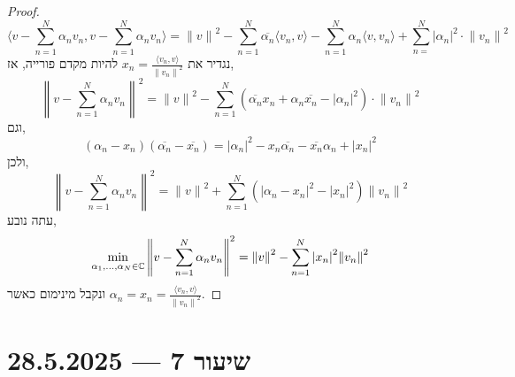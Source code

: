 \begin{proof}
	\[
		\langle v - \sum_{n = 1}^N \alpha_n v_n, v - \sum_{n = 1}^N \alpha_n v_n \rangle
		= {\lVert v \rVert}^2 - \sum_{n = 1}^N \overline{\alpha_n} \langle v_n, v \rangle - \sum_{n = 1}^N \alpha_n \langle v, v_n \rangle + \sum_{n = }^N {| \alpha_n |}^2 \cdot {\lVert v_n \rVert}^2
	\]
	נגדיר את $x_n = \frac{\langle v_n, v \rangle}{{\lVert v_n \rVert}^2}$ להיות מקדם פורייה, אז,
	\[
		{\left\lVert v - \sum_{n = 1}^N \alpha_n v_n \right\rVert}^2
		= {\lVert v \rVert}^2 - \sum_{n = 1}^N (\overline{\alpha_n} x_n + \alpha_n \overline{x_n} - {| \alpha_n |}^2) \cdot {\lVert v_n \rVert}^2
	\]
	וגם,
	\[
		(\alpha_n - x_n)(\overline{\alpha_n} - \overline{x_n})
		= {|\alpha_n|}^2 - x_n \overline{\alpha_n} - \overline{x_n} \alpha_n  + {|x_n|}^2
	\]
	ולכן,
	\[
		{\left\lVert v - \sum_{n = 1}^N \alpha_n v_n \right\rVert}^2
		= {\lVert v \rVert}^2 + \sum_{n = 1}^N \left( {|\alpha_n - x_n|}^2 - {|x_n|}^2 \right) {\lVert v_n \rVert}^2
	\]
	עתה נובע,
	\[
		\min_{\alpha_1, \ldots, \alpha_N \in \mathbb{C}} {\left\lVert v - \sum_{n = 1}^N \alpha_n v_n \right\rVert}^2
		= {\lVert v \rVert}^2 - \sum_{n = 1}^N {|x_n|}^2 {\lVert v_n \rVert}^2
	\]
	ונקבל מינימום כאשר $\alpha_n = x_n = \frac{\langle v_n, v \rangle}{{\lVert v_n \rVert}^2}$.
\end{proof}

\section{שיעור 7 --- 28.5.2025}

